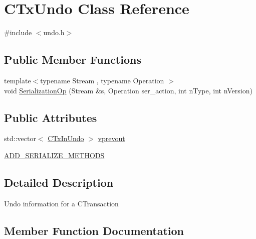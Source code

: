 \hypertarget{class_c_tx_undo}{}\section{C\+Tx\+Undo Class Reference}
\label{class_c_tx_undo}


{\ttfamily \#include $<$undo.\+h$>$}

\subsection*{Public Member Functions}
\begin{DoxyCompactItemize}
\item 
{\footnotesize template$<$typename Stream , typename Operation $>$ }\\void \mbox{\hyperlink{class_c_tx_undo_acded3ea0adf0309c160ea756a2361bf2}{Serialization\+Op}} (Stream \&s, Operation ser\+\_\+action, int n\+Type, int n\+Version)
\end{DoxyCompactItemize}
\subsection*{Public Attributes}
\begin{DoxyCompactItemize}
\item 
std\+::vector$<$ \mbox{\hyperlink{class_c_tx_in_undo}{C\+Tx\+In\+Undo}} $>$ \mbox{\hyperlink{class_c_tx_undo_a035e62f0b46f0d4ba392dad686ed18de}{vprevout}}
\item 
\mbox{\hyperlink{class_c_tx_undo_a8b7b4f167a00e200723165b3446cc4c4}{A\+D\+D\+\_\+\+S\+E\+R\+I\+A\+L\+I\+Z\+E\+\_\+\+M\+E\+T\+H\+O\+DS}}
\end{DoxyCompactItemize}


\subsection{Detailed Description}
Undo information for a C\+Transaction 

\subsection{Member Function Documentation}
\mbox{\label{class_c_tx_undo_acded3ea0adf0309c160ea756a2361bf2}} 

